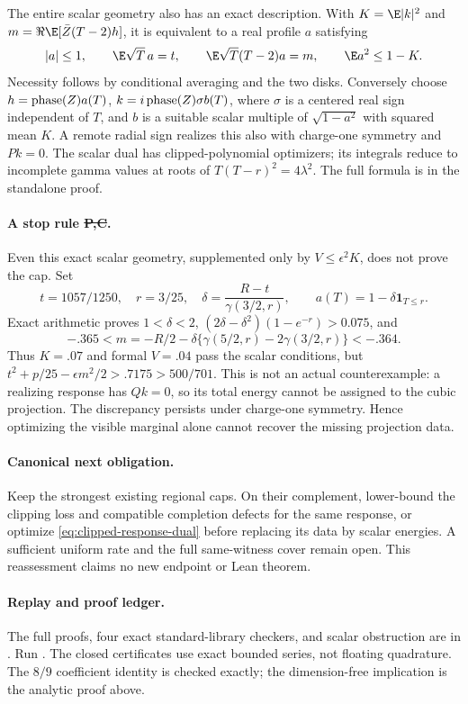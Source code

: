 The entire scalar geometry also has an exact description. With
$K=\E|k|^2$ and $m=\Re\E[\bar Z(T-2)h]$, it is equivalent to
a real profile $a$ satisfying
\[
 |a|\le1,\qquad \E\sqrt T\,a=t,\qquad
 \E\sqrt T(T-2)a=m,\qquad \E a^2\le1-K.
\]
Necessity follows by conditional averaging and the two disks.
Conversely choose $h=\operatorname{phase}(Z)a(T)$,
$k=i\operatorname{phase}(Z)\sigma b(T)$, where $\sigma$ is a centered real sign
independent of $T$, and $b$ is a suitable scalar multiple of
$\sqrt{1-a^2}$ with squared mean $K$. A remote radial sign realizes
this also with charge-one symmetry and $Pk=0$.
The scalar dual has clipped-polynomial optimizers; its integrals
reduce to incomplete gamma values at roots of
$T(T-r)^2=4\lambda^2$. The full formula is in the standalone proof.

\paragraph{A stop rule \st{P,C}.}
Even this exact scalar geometry, supplemented only by
$V\le\epsilon^2K$, does not prove the cap. Set
\[
 t=1057/1250,\quad r=3/25,\quad
 \delta=\frac{R-t}{\gamma(3/2,r)},\qquad
 a(T)=1-\delta\mathbf1_{T\le r}.
\]
Exact arithmetic proves $1<\delta<2$,
$(2\delta-\delta^2)(1-e^{-r})>0.075$, and
\[
 -.365<m=-R/2-\delta\{\gamma(5/2,r)-2\gamma(3/2,r)\}<-.364.
\]
Thus $K=.07$ and formal $V=.04$ pass the scalar conditions, but
$t^2+p/25-\epsilon m^2/2>.7175>500/701$.
This is not an actual counterexample: a realizing response has
$Qk=0$, so its total energy cannot be assigned to the cubic projection.
The discrepancy persists under charge-one symmetry. Hence optimizing
the visible marginal alone cannot recover the missing projection data.

\paragraph{Canonical next obligation.}
Keep the strongest existing regional caps. On their complement,
lower-bound the clipping loss and compatible completion defects
for the same response, or optimize \eqref{eq:clipped-response-dual}
before replacing its data by scalar energies. A sufficient uniform
rate and the full same-witness cover remain open. This reassessment
claims no new endpoint or Lean theorem.

\paragraph{Replay and proof ledger.}
The full proofs, four exact standard-library checkers, and scalar
obstruction are in
.
Run .
The closed certificates use exact bounded series, not floating quadrature.
The $8/9$ coefficient identity is checked exactly; the dimension-free
implication is the analytic proof above.


